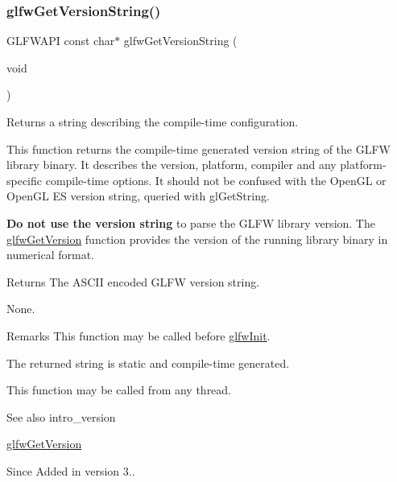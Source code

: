 \subsubsection{\texorpdfstring{glfw\+Get\+Version\+String()}{glfwGetVersionString()}}
{\footnotesize\ttfamily G\+L\+F\+W\+A\+PI const char$\ast$ glfw\+Get\+Version\+String (\begin{DoxyParamCaption}\item[{void}]{ }\end{DoxyParamCaption})}



Returns a string describing the compile-\/time configuration. 

This function returns the compile-\/time generated version string of the G\+L\+FW library binary. It describes the version, platform, compiler and any platform-\/specific compile-\/time options. It should not be confused with the Open\+GL or Open\+GL ES version string, queried with {\ttfamily gl\+Get\+String}.

{\bfseries Do not use the version string} to parse the G\+L\+FW library version. The \hyperlink{group__init_ga2402c7824ac0194c13722790ff9559ff}{glfw\+Get\+Version} function provides the version of the running library binary in numerical format.

\begin{DoxyReturn}{Returns}
The A\+S\+C\+II encoded G\+L\+FW version string.
\end{DoxyReturn}
None.

\begin{DoxyRemark}{Remarks}
This function may be called before \hyperlink{group__init_gab41771f0215a2e0afb4cf1cf98082d40}{glfw\+Init}.
\end{DoxyRemark}
The returned string is static and compile-\/time generated.

This function may be called from any thread.

\begin{DoxySeeAlso}{See also}
intro\+\_\+version 

\hyperlink{group__init_ga2402c7824ac0194c13722790ff9559ff}{glfw\+Get\+Version}
\end{DoxySeeAlso}
\begin{DoxySince}{Since}
Added in version 3.. 
\end{DoxySince}
\mbox{\label{group__init_gab41771f0215a2e0afb4cf1cf98082d40}} 
